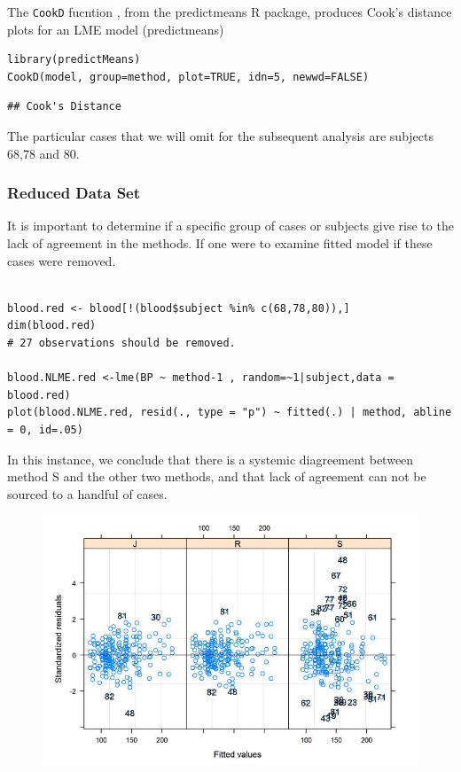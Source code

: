 The \texttt{CookD} fucntion , from the predictmeans R package, produces Cook’s distance plots for an LME model 
 (predictmeans)



\begin{framed}
\begin{verbatim}
library(predictMeans)
CookD(model, group=method, plot=TRUE, idn=5, newwd=FALSE)
\end{verbatim}
\end{framed}


\begin{verbatim}
## Cook's Distance

\end{verbatim}

The particular cases that we will omit for the subsequent analysis are subjects 68,78 and 80.

\subsubsection{Reduced Data Set}
It is important to determine if a specific group of cases or subjects give rise to the lack of agreement in the methods. If one were to examine fitted model if these cases were removed.

\begin{framed}
\begin{verbatim}

blood.red <- blood[!(blood$subject %in% c(68,78,80)),]
dim(blood.red)
# 27 observations should be removed.

blood.NLME.red <-lme(BP ~ method-1 , random=~1|subject,data = blood.red)
plot(blood.NLME.red, resid(., type = "p") ~ fitted(.) | method, abline = 0, id=.05)
\end{verbatim}
\end{framed}

In this instance, we conclude that there is a systemic diagreement between method S and the other two methods, and that lack of agreement can not be sourced to a handful of cases.
\begin{figure}[h!]
	\centering
	\includegraphics[width=0.7\linewidth]{images/bloodnlmeResidPlot2B}
\end{figure}


